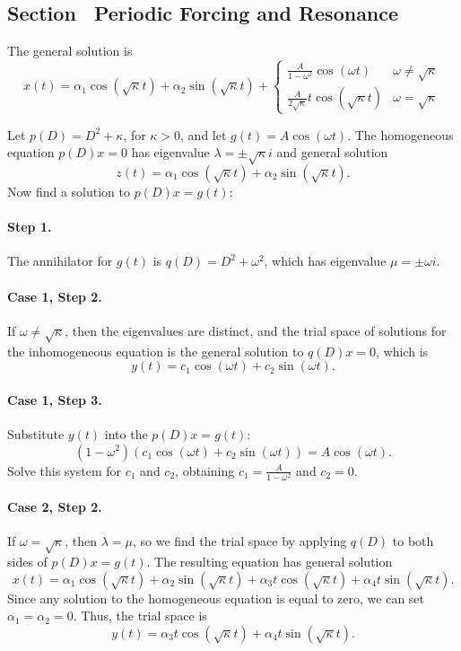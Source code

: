 \documentclass{ximera}
\begin{document}
\subsection*{Section~\protect{\ref{S:resonance}} Periodic Forcing and Resonance}

 \ans The general solution is
\[
x(t) = \alpha_1\cos(\sqrt{\kappa}t) + \alpha_2\sin(\sqrt{\kappa}t)
+ \left\{
\begin{array}{lr} \frac{A}{1 - \omega^2}\cos(\omega t) &
\omega \neq \sqrt{\kappa} \\
\frac{A}{2\sqrt{\kappa}}t\cos(\sqrt{\kappa}t) &
\omega = \sqrt{\kappa}
\end{array}\right.
\]

\soln Let $p(D) = D^2 + \kappa$, for $\kappa > 0$, and let $g(t) =
A\cos(\omega t)$.  The homogeneous equation $p(D)x = 0$ has eigenvalue
$\lambda = \pm \sqrt{\kappa} i$ and general solution
\[
z(t) = \alpha_1\cos(\sqrt{\kappa}t) + \alpha_2\sin(\sqrt{\kappa}t).
\]
Now find a solution to $p(D)x = g(t)$:

\paragraph{Step 1.} The annihilator for $g(t)$ is $q(D) =
D^2 + \omega^2$, which has eigenvalue $\mu = \pm \omega i$.

\paragraph{Case 1, Step 2.} If $\omega \neq \sqrt{\kappa}$, then the
eigenvalues are distinct, and the trial space of solutions for the
inhomogeneous equation is the general solution to $q(D)x = 0$, which
is
\[
y(t) = c_1\cos(\omega t) + c_2\sin(\omega t).
\]
\paragraph{Case 1, Step 3.} Substitute $y(t)$ into the $p(D)x = g(t)$:
\[
(1 - \omega^2)(c_1\cos(\omega t) + c_2\sin(\omega t)) = A\cos(\omega t).
\]
Solve this system for $c_1$ and $c_2$, obtaining $c_1 = \frac{A}
{1 - \omega^2}$ and $c_2 = 0$.

\paragraph{Case 2, Step 2.} If $\omega = \sqrt{\kappa}$, then $\lambda =
\mu$, so we find the trial space by applying $q(D)$ to both sides of
$p(D)x = g(t)$.  The resulting equation has general solution
\[
x(t) = \alpha_1\cos(\sqrt{\kappa}t) + \alpha_2\sin(\sqrt{\kappa}t)
+ \alpha_3t\cos(\sqrt{\kappa}t) + \alpha_4t\sin(\sqrt{\kappa}t).
\]
Since any solution to the homogeneous equation is equal to zero, we can
set $\alpha_1 = \alpha_2 = 0$.  Thus, the trial space is
\[
y(t) = \alpha_3t\cos(\sqrt{\kappa}t) + \alpha_4t\sin(\sqrt{\kappa}t).
\]
\end{document}

